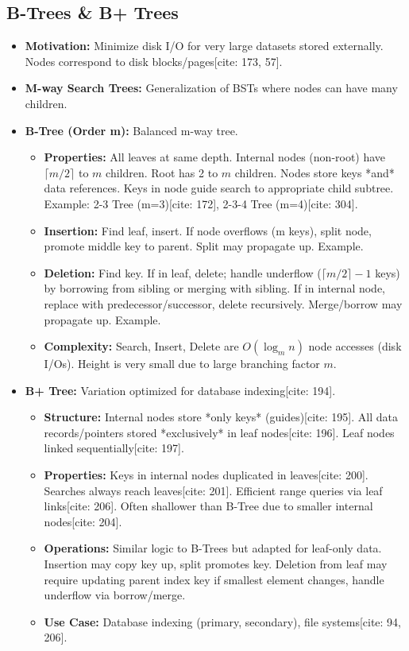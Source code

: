\documentclass{article}
\begin{document}
\subsection{B-Trees \& B+ Trees}
\begin{itemize}
    \item \textbf{Motivation:} Minimize disk I/O for very large datasets stored externally. Nodes correspond to disk blocks/pages[cite: 173, 57].
    \item \textbf{M-way Search Trees:} Generalization of BSTs where nodes can have many children.
    \item \textbf{B-Tree (Order m):} Balanced m-way tree.
          \begin{itemize}
              \item \textbf{Properties:} All leaves at same depth. Internal nodes (non-root) have $\lceil m/2 \rceil$ to $m$ children. Root has 2 to $m$ children. Nodes store keys *and* data references. Keys in node guide search to appropriate child subtree. Example: 2-3 Tree (m=3)[cite: 172], 2-3-4 Tree (m=4)[cite: 304].
              \item \textbf{Insertion:} Find leaf, insert. If node overflows (m keys), split node, promote middle key to parent. Split may propagate up. Example.
              \item \textbf{Deletion:} Find key. If in leaf, delete; handle underflow ($\lceil m/2 \rceil - 1$ keys) by borrowing from sibling or merging with sibling. If in internal node, replace with predecessor/successor, delete recursively. Merge/borrow may propagate up. Example.
              \item \textbf{Complexity:} Search, Insert, Delete are $O(\log_m n)$ node accesses (disk I/Os). Height is very small due to large branching factor $m$.
          \end{itemize}
    \item \textbf{B+ Tree:} Variation optimized for database indexing[cite: 194].
          \begin{itemize}
              \item \textbf{Structure:} Internal nodes store *only keys* (guides)[cite: 195]. All data records/pointers stored *exclusively* in leaf nodes[cite: 196]. Leaf nodes linked sequentially[cite: 197].
              \item \textbf{Properties:} Keys in internal nodes duplicated in leaves[cite: 200]. Searches always reach leaves[cite: 201]. Efficient range queries via leaf links[cite: 206]. Often shallower than B-Tree due to smaller internal nodes[cite: 204].
              \item \textbf{Operations:} Similar logic to B-Trees but adapted for leaf-only data. Insertion may copy key up, split promotes key. Deletion from leaf may require updating parent index key if smallest element changes, handle underflow via borrow/merge.
              \item \textbf{Use Case:} Database indexing (primary, secondary), file systems[cite: 94, 206].
          \end{itemize}
\end{itemize}
\end{document}
